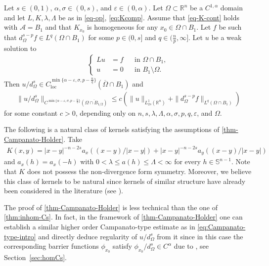 \documentclass[11pt,reqno]{amsart}
\theoremstyle{plain}
\theoremstyle{definition}
\numberwithin{equation}{section}
\newcommand{\R}{\mathbb{R}}
\newcommand{\eps}{\varepsilon}
\newcommand{\1}{\mathbbm{1}}
\begin{document}
\begin{theorem}\label{thm-Campanato-Holder}
Let $s \in (0,1)$, $\alpha,\sigma \in (0,s)$, and $\eps \in (0,\alpha)$. Let $\Omega \subset \R^n$ be a $C^{1,\alpha}$ domain and let $L,K,\lambda,\Lambda$ be as in \eqref{eq-op}, \eqref{eq:Kcomp}. Assume that \eqref{eq-K-cont} holds with $\mathcal{A} = B_1$ and that $K_{x_0}$ is homogeneous for any $x_0 \in \Omega \cap B_{1}$. Let $f$ be such that $d_{\Omega}^{s-p}f \in L^q(\Omega \cap B_1)$ for some $p \in (0,s]$ and $q \in (\frac{n}{p},\infty]$.
Let $u$ be a weak solution to
\begin{align*}
\left\{
\begin{aligned}
Lu&=f &&\text{in }\Omega \cap B_1, \\
u&=0 &&\text{in } B_1 \setminus \Omega.
\end{aligned}
\right.
\end{align*}
Then $u/d_\Omega^s \in C^{\min\{\alpha - \eps ,\sigma,p - \frac{n}{q}\}}_{\mathrm{loc}}(\overline{\Omega} \cap B_1)$ and
\begin{align*}
\|u/d_\Omega^s\|_{C^{\min\{\alpha - \eps ,\sigma,p - \frac{n}{q}\}}(\overline{\Omega \cap B_{1/2}})} \leq c \left( \|u\|_{L^1_{2s}(\R^n)} + \|d_{\Omega}^{s-p} f\|_{L^q(\Omega \cap B_1)} \right)
\end{align*}
for some constant $c > 0$, depending only on $n, s, \lambda, \Lambda, \alpha, \sigma, p, q, \eps$, and $\Omega$.
\end{theorem}

The following is a natural class of kernels satisfying the assumptions of \autoref{thm-Campanato-Holder}. Take
\begin{align*}
    K(x,y) = |x-y|^{-n-2s} a_x((x-y)/|x-y|) + |x-y|^{-n-2s} a_y((x-y)/|x-y|) 
\end{align*}
and $a_x(h) = a_x(-h)$ with $0 < \lambda \le a(h) \le \Lambda < \infty$ for every $h \in \mathbb{S}^{n-1}$. Note that $K$ does not possess the non-divergence form symmetry. Moreover, we believe this class of kernels to be natural since kernels of similar structure have already been considered in the literature (see \cite{BKS19,FeRo24b}).

The proof of \autoref{thm-Campanato-Holder} is less technical than the one of \autoref{thm:inhom-Cs}. In fact, in the framework of \autoref{thm-Campanato-Holder} one can establish a similar higher order Campanato-type estimate as in \eqref{eq:Campanato-type-intro} and directly deduce regularity of $u/d_{\Omega}^s$ from it since in this case the corresponding barrier functions $\phi_{x_0}$ satisfy $\phi_{x_0}/d_{\Omega}^s \in C^{\alpha}$ due to \cite{RoSe17}, see Section~\ref{sec:homCs}.
\end{document}
